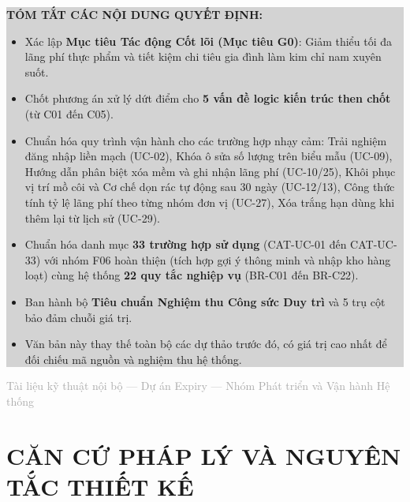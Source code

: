 \documentclass[10pt,a4paper]{article}
\begin{document}
\begin{titlepage}
\begin{center}
    \vspace{1.0cm}
    \begin{minipage}{0.92\textwidth}
    \colorbox{lightgray}{
        \begin{minipage}{\dimexpr\textwidth-2\fboxsep\relax}
        \vspace{0.25cm}
        \textbf{\color{primary}TÓM TẮT CÁC NỘI DUNG QUYẾT ĐỊNH:}
        \begin{itemize}[leftmargin=1.5em,itemsep=2pt]
            \item Xác lập \textbf{Mục tiêu Tác động Cốt lõi (Mục tiêu G0)}: Giảm thiểu tối đa lãng phí thực phẩm và tiết kiệm chi tiêu gia đình làm kim chỉ nam xuyên suốt.
            \item Chốt phương án xử lý dứt điểm cho \textbf{5 vấn đề logic kiến trúc then chốt} (từ C01 đến C05).
            \item Chuẩn hóa quy trình vận hành cho các trường hợp nhạy cảm: Trải nghiệm đăng nhập liền mạch (UC-02), Khóa ô sửa số lượng trên biểu mẫu (UC-09), Hướng dẫn phân biệt xóa mềm và ghi nhận lãng phí (UC-10/25), Khôi phục vị trí mồ côi và Cơ chế dọn rác tự động sau 30 ngày (UC-12/13), Công thức tính tỷ lệ lãng phí theo từng nhóm đơn vị (UC-27), Xóa trắng hạn dùng khi thêm lại từ lịch sử (UC-29).
            \item Chuẩn hóa danh mục \textbf{33 trường hợp sử dụng} (CAT-UC-01 đến CAT-UC-33) với nhóm F06 hoàn thiện (tích hợp gợi ý thông minh và nhập kho hàng loạt) cùng hệ thống \textbf{22 quy tắc nghiệp vụ} (BR-C01 đến BR-C22).
            \item Ban hành bộ \textbf{Tiêu chuẩn Nghiệm thu Công sức Duy trì} và 5 trụ cột bảo đảm chuỗi giá trị.
            \item Văn bản này thay thế toàn bộ các dự thảo trước đó, có giá trị cao nhất để đối chiếu mã nguồn và nghiệm thu hệ thống.
        \end{itemize}
        \vspace{0.2cm}
        \end{minipage}
    }
    \end{minipage}

    \vfill
    {\small\textcolor{darkgray}{Tài liệu kỹ thuật nội bộ --- Dự án Expiry --- Nhóm Phát triển và Vận hành Hệ thống}}
\end{center}
\end{titlepage}

\newpage
\tableofcontents
\newpage

\section{CĂN CỨ PHÁP LÝ VÀ NGUYÊN TẮC THIẾT KẾ}
\end{document}
